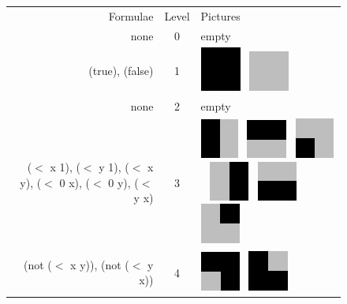 \begin{figure}
\begin{center}
\begin{tabular}{r c l}
Formulae & Level & Pictures \\
\tiny{none} & 0 & empty \\
\tiny{(true), (false)} & 1 &
    \includegraphics[width=.25in]{../presentation/2x2/Shape1LVL1.png}~
    \includegraphics[width=.25in]{../presentation/2x2/Shape2LVL1.png} \\
\tiny{none} & 2 & empty \\
\tiny{($<$ x 1), ($<$ y 1), ($<$ x y), ($<$ 0 x), ($<$ 0 y), ($<$ y x)} & 3 & 
    \includegraphics[width=.25in]{../presentation/2x2/Shape1LVL3.png}~
    \includegraphics[width=.25in]{../presentation/2x2/Shape2LVL3.png}~
    \includegraphics[width=.25in]{../presentation/2x2/Shape5LVL3.png}~
    \includegraphics[width=.25in]{../presentation/2x2/Shape6LVL3.png}~
    \includegraphics[width=.25in]{../presentation/2x2/Shape3LVL3.png}~
    \includegraphics[width=.25in]{../presentation/2x2/Shape4LVL3.png}\\
\tiny{(not ($<$ x y)), (not ($<$ y x))} & 4 & 
    \includegraphics[width=.25in]{../presentation/2x2/Shape2LVL4.png}~
    \includegraphics[width=.25in]{../presentation/2x2/Shape1LVL4.png} \\

\end{tabular}
\end{center}
\end{figure}
